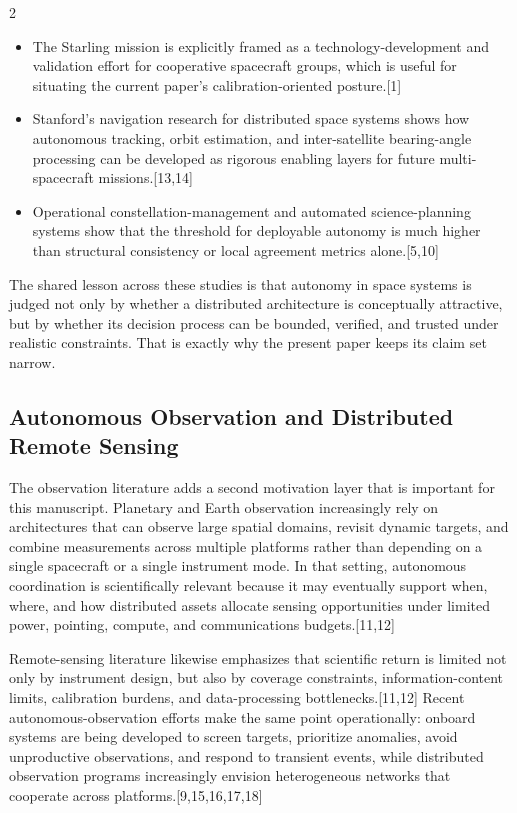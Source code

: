 \documentclass[fleqn,10pt,letterpaper]{article}
\begin{document}
\begin{multicols}{2}
\begin{itemize}
\item The Starling mission is explicitly framed as a technology-development and validation effort for cooperative spacecraft groups, which is useful for situating the current paper's calibration-oriented posture.[1]
\item Stanford's navigation research for distributed space systems shows how autonomous tracking, orbit estimation, and inter-satellite bearing-angle processing can be developed as rigorous enabling layers for future multi-spacecraft missions.[13,14]
\item Operational constellation-management and automated science-planning systems show that the threshold for deployable autonomy is much higher than structural consistency or local agreement metrics alone.[5,10]
\end{itemize}
The shared lesson across these studies is that autonomy in space systems is judged not only by whether a distributed architecture is conceptually attractive, but by whether its decision process can be bounded, verified, and trusted under realistic constraints. That is exactly why the present paper keeps its claim set narrow.


\subsection{Autonomous Observation and Distributed Remote Sensing}

The observation literature adds a second motivation layer that is important for this manuscript. Planetary and Earth observation increasingly rely on architectures that can observe large spatial domains, revisit dynamic targets, and combine measurements across multiple platforms rather than depending on a single spacecraft or a single instrument mode. In that setting, autonomous coordination is scientifically relevant because it may eventually support when, where, and how distributed assets allocate sensing opportunities under limited power, pointing, compute, and communications budgets.[11,12]

Remote-sensing literature likewise emphasizes that scientific return is limited not only by instrument design, but also by coverage constraints, information-content limits, calibration burdens, and data-processing bottlenecks.[11,12] Recent autonomous-observation efforts make the same point operationally: onboard systems are being developed to screen targets, prioritize anomalies, avoid unproductive observations, and respond to transient events, while distributed observation programs increasingly envision heterogeneous networks that cooperate across platforms.[9,15,16,17,18]


\end{multicols}
\end{document}
